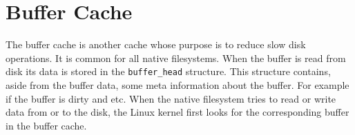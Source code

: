 \section{Buffer Cache}
The buffer cache is another cache whose purpose is to reduce slow disk operations. It is
common for all native filesystems. When the buffer is read from disk its data is stored
in the \texttt{buffer\_head} structure. This structure contains, aside from the
buffer data,
some meta information about the buffer. For example if the buffer is dirty and
etc.
When the native filesystem tries to read or write  data from or to the disk, the Linux
kernel first looks for the corresponding buffer in the buffer cache. 

